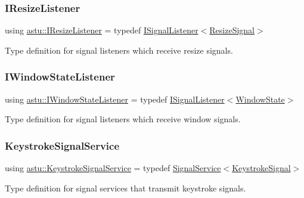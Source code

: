 \subsubsection{\texorpdfstring{I\+Resize\+Listener}{IResizeListener}}
{\footnotesize\ttfamily using \hyperlink{group__input__group_ga643e71e95d0724fed5787e35e83fc1dd}{astu\+::\+I\+Resize\+Listener} = typedef \hyperlink{classastu_1_1ISignalListener}{I\+Signal\+Listener}$<$\hyperlink{classastu_1_1ResizeSignal}{Resize\+Signal}$>$}

Type definition for signal listeners which receive resize signals. \mbox{\label{group__input__group_ga6552730babe8f256434adff50c8f5c7e}} 
\subsubsection{\texorpdfstring{I\+Window\+State\+Listener}{IWindowStateListener}}
{\footnotesize\ttfamily using \hyperlink{group__input__group_ga6552730babe8f256434adff50c8f5c7e}{astu\+::\+I\+Window\+State\+Listener} = typedef \hyperlink{classastu_1_1ISignalListener}{I\+Signal\+Listener}$<$\hyperlink{classastu_1_1WindowState}{Window\+State}$>$}

Type definition for signal listeners which receive window signals. \mbox{\label{group__input__group_gaef1a6a6bcf29be13022699bae86ab903}} 
\subsubsection{\texorpdfstring{Keystroke\+Signal\+Service}{KeystrokeSignalService}}
{\footnotesize\ttfamily using \hyperlink{group__input__group_gaef1a6a6bcf29be13022699bae86ab903}{astu\+::\+Keystroke\+Signal\+Service} = typedef \hyperlink{classastu_1_1SignalService}{Signal\+Service}$<$\hyperlink{classastu_1_1KeystrokeSignal}{Keystroke\+Signal}$>$}

Type definition for signal services that transmit keystroke signals. \mbox{\label{group__input__group_gaef177cf232be6c7241aa5666eda79fe2}} 
